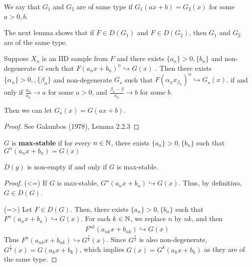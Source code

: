 We say that $G_{1}$ and $G_{2}$ are of same type if $G_{1}(ax + b) =
G_{2}(x)$ for some $a > 0, b$.

The next lemma shows that if $F \in D(G_{1})$ and $F \in D(G_{2})$,
then $G_{1}$ and $G_{2}$ are of the same type.

\begin{lem}
  Suppose $X_{n}$ is an IID sample from $F$ and there exists $\{ a_{n}
  \} > 0, \{ b_{n} \}$ and non-degenerate $G$ such that $F(a_{n} x
  +b_{n})^{n} \hookrightarrow G(x)$ .  Then there exists $\{ \alpha_{n} \} > 0,
, \{ \beta_{n} \}$ and non-degenerate $G_{\star}$ such that
$F(\alpha_{n} x _{ \beta_{n}})^{n} \hookrightarrow G_{\star}(x)$. if and
only if $\frac{\alpha_{n}}{a_{n}} \rightarrow a$ for some $a > 0$, and
$\frac{\beta_{n} - \beta}{a_{n}} \rightarrow b$ for some $b$.

Then we can let $G_{\star}(x) = G(ax + b)$.
\end{lem}

\begin{proof}
  See Galambos (1978), Lemma 2.2.3
\end{proof}

\begin{defn}
  \label{defn:extreme_value_theory:1}
  $G$ is \textbf{max-stable} if for every $n \in \mathbb{N}$, there exists
  $\{ a_{n} \} > 0, \{ b_{n} \} $ such that $G^{n}(a_{n}x + b_{n}) = G(x)$
\end{defn}

\begin{thm}
  \label{defn:extreme_value_theory:2}
  $D(g)$ is non-empty if and only if $G$ is max-stable.
\end{thm}

\begin{proof}
  (<=) If $G$ is max-stable, $G^{n}(a_{n} x + b_{n}) \hookrightarrow
  G(x)$.  Thus, by definitino, $G \in D(G)$.

  (=>) Let $F \in D(G)$. Then, there exists $\{ a_{n} \} > 0, \{ b_{n}
  \}$ such that $F^{n}(a_{n} x + b_{n}) \hookrightarrow G(x)$.  For
  each $k \in \mathbb{N}$, we replace $n$ by $nk$, and then
  \begin{align}
    \label{eq:121}
    F^{nk}(a_{nk} x + b_{nk}) \hookrightarrow G(x) 
  \end{align}
  Thus $F^{n}(a_{nk} x + b_{nk}) \hookrightarrow G^{\frac{1}{k}}(x)$.
  Since $G^{\frac{1}{k}}$ is also non-degenerate, $G^{\frac{1}{k}}(x)
  = G(a_{k} x + b_{k})$, which implies $G(x) = G^{k}(a_{k} x + b_{k})$
  as they are of the same type.
\end{proof}

